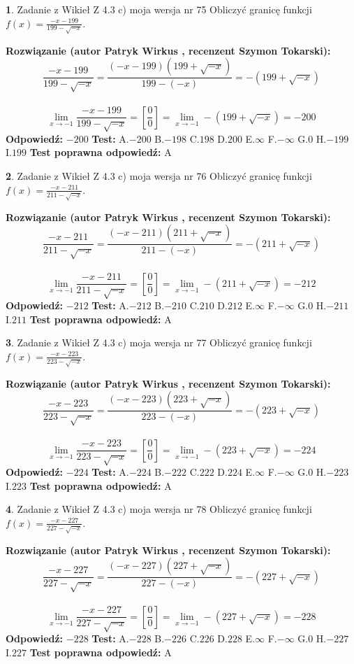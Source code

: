 \documentclass[12pt, a4paper]{article}
\theoremstyle{definition} %
\newtheorem{zad}{}
\newcommand{\zadStart}[1]{\begin{zad}#1\newline}
\newcommand{\zadStop}{\end{zad}}
\newcommand{\rozwStart}[2]{\noindent \textbf{Rozwiązanie (autor #1 , recenzent #2): }\newline}
\newcommand{\rozwStop}{\newline}
\newcommand{\odpStart}{\noindent \textbf{Odpowiedź:}\newline}
\newcommand{\odpStop}{\newline}
\newcommand{\testStart}{\noindent \textbf{Test:}\newline}
\newcommand{\testStop}{\newline}
\newcommand{\kluczStart}{\noindent \textbf{Test poprawna odpowiedź:}\newline}
\newcommand{\kluczStop}{\newline}
\begin{document}
\zadStart{Zadanie z Wikieł Z 4.3 c) moja wersja nr 75}
Obliczyć granicę funkcji $f(x)=\frac{-x-199}{199-\sqrt{-x}}$.
\zadStop
\rozwStart{Patryk Wirkus}{Szymon Tokarski}
$$\frac{-x-199}{199-\sqrt{-x}}=\frac{(-x-199)(199+\sqrt{-x})}{199-(-x)}=-(199+\sqrt{-x})$$
\\
$$\lim\limits_{x\to-1}\frac{-x-199}{199-\sqrt{-x}}=[\frac{0}{0}]=\lim\limits_{x\to-1}-(199+\sqrt{-x}) =-200$$
\rozwStop
\odpStart
$-200$
\odpStop
\testStart
A.$-200$
B.$-198$
C.$198$
D.$200$
E.$\infty$
F.$-\infty$
G.$0$
H.$-199$
I.$199$
\testStop
\kluczStart
A
\kluczStop



\zadStart{Zadanie z Wikieł Z 4.3 c) moja wersja nr 76}
Obliczyć granicę funkcji $f(x)=\frac{-x-211}{211-\sqrt{-x}}$.
\zadStop
\rozwStart{Patryk Wirkus}{Szymon Tokarski}
$$\frac{-x-211}{211-\sqrt{-x}}=\frac{(-x-211)(211+\sqrt{-x})}{211-(-x)}=-(211+\sqrt{-x})$$
\\
$$\lim\limits_{x\to-1}\frac{-x-211}{211-\sqrt{-x}}=[\frac{0}{0}]=\lim\limits_{x\to-1}-(211+\sqrt{-x}) =-212$$
\rozwStop
\odpStart
$-212$
\odpStop
\testStart
A.$-212$
B.$-210$
C.$210$
D.$212$
E.$\infty$
F.$-\infty$
G.$0$
H.$-211$
I.$211$
\testStop
\kluczStart
A
\kluczStop



\zadStart{Zadanie z Wikieł Z 4.3 c) moja wersja nr 77}
Obliczyć granicę funkcji $f(x)=\frac{-x-223}{223-\sqrt{-x}}$.
\zadStop
\rozwStart{Patryk Wirkus}{Szymon Tokarski}
$$\frac{-x-223}{223-\sqrt{-x}}=\frac{(-x-223)(223+\sqrt{-x})}{223-(-x)}=-(223+\sqrt{-x})$$
\\
$$\lim\limits_{x\to-1}\frac{-x-223}{223-\sqrt{-x}}=[\frac{0}{0}]=\lim\limits_{x\to-1}-(223+\sqrt{-x}) =-224$$
\rozwStop
\odpStart
$-224$
\odpStop
\testStart
A.$-224$
B.$-222$
C.$222$
D.$224$
E.$\infty$
F.$-\infty$
G.$0$
H.$-223$
I.$223$
\testStop
\kluczStart
A
\kluczStop



\zadStart{Zadanie z Wikieł Z 4.3 c) moja wersja nr 78}
Obliczyć granicę funkcji $f(x)=\frac{-x-227}{227-\sqrt{-x}}$.
\zadStop
\rozwStart{Patryk Wirkus}{Szymon Tokarski}
$$\frac{-x-227}{227-\sqrt{-x}}=\frac{(-x-227)(227+\sqrt{-x})}{227-(-x)}=-(227+\sqrt{-x})$$
\\
$$\lim\limits_{x\to-1}\frac{-x-227}{227-\sqrt{-x}}=[\frac{0}{0}]=\lim\limits_{x\to-1}-(227+\sqrt{-x}) =-228$$
\rozwStop
\odpStart
$-228$
\odpStop
\testStart
A.$-228$
B.$-226$
C.$226$
D.$228$
E.$\infty$
F.$-\infty$
G.$0$
H.$-227$
I.$227$
\testStop
\kluczStart
A
\kluczStop
\end{document}
